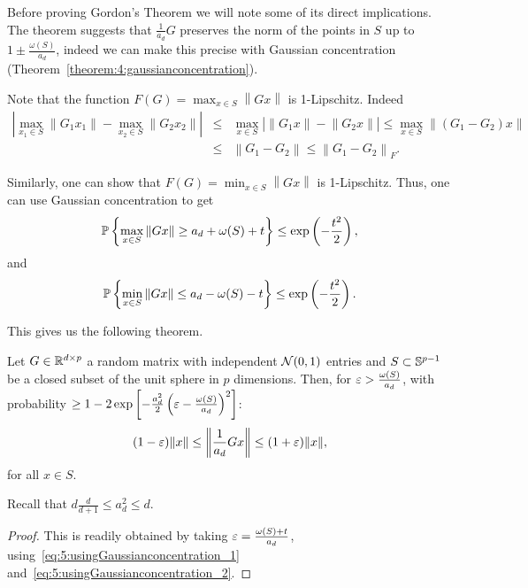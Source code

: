 Before proving Gordon's Theorem we will note some of its direct implications. The theorem suggests that $\frac1{a_d}G$ preserves the norm of the points in $S$ up to $1\pm \frac{\omega(S)}{a_d}$, indeed we can make this precise with Gaussian concentration (Theorem~\ref{theorem:4:gaussianconcentration}).

Note that the function $F(G) = \max_{x\in S} \left\|Gx\right\|$ is 1-Lipschitz. Indeed
\begin{eqnarray*}
\left| \max_{x_1\in S}\left\| G_1x_1\right\|  - \max_{x_2\in S}\left\| G_2x_2\right\| \right| & \leq & \max_{x\in S} \left| \left\| G_1x\right\|  - \left\| G_2x\right\| \right| \leq \max_{x\in S} \left\| \left( G_1 - G_2 \right)x\right\| \\
& \leq & \left\|  G_1 - G_2\right\| \leq \left\|  G_1 - G_2\right\|_F.
\end{eqnarray*}

Similarly, one can show that $F(G) = \min_{x\in S} \left\| Gx\right\|$ is 1-Lipschitz.
Thus, one can use Gaussian concentration to get
\begin{equation}\label{eq:5:usingGaussianconcentration_1}
{\mathbb{P}}\left\{ \max_{x\in S} \|Gx\| \geq a_d + \omega(S) + t  \right\} \leq \exp\left( -\frac{t^2}2 \right),
\end{equation}
and
\begin{equation}\label{eq:5:usingGaussianconcentration_2}
{\mathbb{P}}\left\{ \min_{x\in S} \|Gx\| \leq a_d - \omega(S) - t  \right\} \leq \exp\left( -\frac{t^2}2 \right).
\end{equation}

This gives us the following theorem.

\begin{theorem}\label{thm:Gordon:afterGconcentration}
 Let $G\in\mathbb{R}^{d\times p}$ a random matrix with independent $\mathcal{N}(0,1)$ entries and $S\subset \mathbb{S}^{p-1}$ be a closed subset of the unit sphere in $p$ dimensions. Then, for $\varepsilon>\frac{\omega(S)}{a_d}$, with probability $\geq 1-2\exp\left[ -\frac{a_d^2}{2}\left( \varepsilon - \frac{\omega(S)}{a_d}  \right)^2\right]$:
\[
 (1-\varepsilon)\|x\| \leq \left\| \frac1{a_d} Gx  \right\| \leq (1+\varepsilon)\|x\|,
\]
for all $x\in S$.

Recall that $d\frac{d}{d+1} \leq a_d^2 \leq d$.
 \end{theorem}

\begin{proof}
This is readily obtained by taking $\varepsilon = \frac{\omega(S)+t}{a_d}$, using~\eqref{eq:5:usingGaussianconcentration_1} and~\eqref{eq:5:usingGaussianconcentration_2}.
\end{proof}



